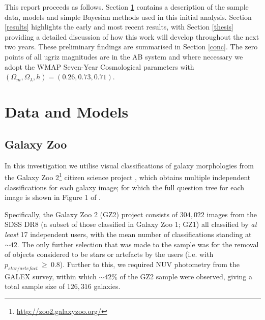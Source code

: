 \documentclass{mn2e}
\begin{document}
This report proceeds as follows. Section \ref{data} contains a description of the sample data, models and simple Bayesian methods used in this initial analysis. Section \ref{results} highlights the early and most recent results, with Section \ref{thesis} providing a detailed discussion of how this work will develop throughout the next two years. These preliminary findings are summarised in Section \ref{conc}. The zero points of all ugriz magnitudes are in the AB system and where necessary we adopt the WMAP Seven-Year Cosmological parameters \citep{WMAP} with $(\Omega_m, \Omega_{\lambda}, h) = (0.26, 0.73, 0.71)$. 

\section{Data and Models}\label{data}

\subsection{Galaxy Zoo}
In this investigation we utilise visual classifications of galaxy morphologies from the Galaxy Zoo 2\footnote{\url{http://zoo2.galaxyzoo.org/}} citizen science project \citep{GZ2}, which obtains multiple independent classifications for each galaxy image; for which the full question tree for each image is shown in Figure 1 of \citet{GZ2}.  

Specifically, the Galaxy Zoo 2 (GZ2) project consists of $304, 022$ images from the SDSS DR8 (a subset of those classified in Galaxy Zoo 1; GZ1) all classified by \emph{at least} 17 independent users, with the mean number of classifications standing at $\sim42$.
The only further selection that was made to the sample was for the removal of  objects considered to be stars or artefacts by the users (i.e. with $p_{star/artefact} ~\geq~ 0.8$). Further to this, we required NUV photometry from the GALEX survey, within which $\sim42\%$ of the GZ2 sample were observed, giving a total sample size of $126, 316$ galaxies. 

\end{document}
